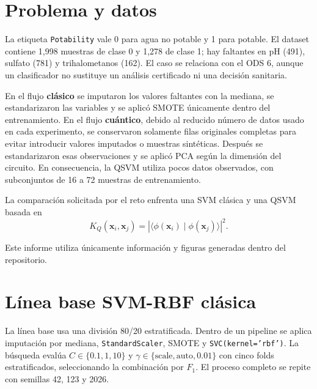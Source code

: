 \documentclass[9pt,a4paper]{extarticle}
\begin{document}
\section{Problema y datos}
La etiqueta \texttt{Potability} vale 0 para agua no potable y 1 para potable. El dataset contiene 1,998 muestras de clase 0 y 1,278 de clase 1; hay faltantes en pH (491), sulfato (781) y trihalometanos (162). El caso se relaciona con el ODS 6, aunque un clasificador no sustituye un análisis certificado ni una decisión sanitaria.

En el flujo \textbf{clásico} se imputaron los valores faltantes con la mediana, se estandarizaron las variables y se aplicó SMOTE únicamente dentro del entrenamiento. En el flujo \textbf{cuántico}, debido al reducido número de datos usado en cada experimento, se conservaron solamente filas originales completas para evitar introducir valores imputados o muestras sintéticas. Después se estandarizaron esas observaciones y se aplicó PCA según la dimensión del circuito. En consecuencia, la QSVM utiliza pocos datos observados, con subconjuntos de 16 a 72 muestras de entrenamiento.

La comparación solicitada por el reto enfrenta una SVM clásica y una QSVM basada en
\begin{equation}
K_Q(\mathbf{x}_i,\mathbf{x}_j)
=\left|\langle\phi(\mathbf{x}_i)\mid\phi(\mathbf{x}_j)\rangle\right|^2.
\end{equation}
\par\smallskip\noindent Este informe utiliza únicamente información y figuras generadas dentro del repositorio.

\clearpage
\section{Línea base SVM-RBF clásica}
La línea base usa una división 80/20 estratificada. Dentro de un pipeline se aplica imputación por mediana, \texttt{StandardScaler}, SMOTE y \texttt{SVC(kernel='rbf')}. La búsqueda evalúa $C\in\{0.1,1,10\}$ y $\gamma\in\{\mathrm{scale},\mathrm{auto},0.01\}$ con cinco folds estratificados, seleccionando la combinación por $F_1$. El proceso completo se repite con semillas 42, 123 y 2026.
\end{document}
